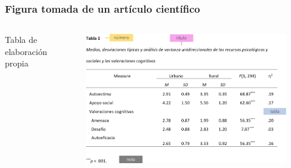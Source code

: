 \documentclass[
11pt, %
]{beamer}
\begin{document}
\begin{frame}
	\frametitle{Figura tomada de un artículo científico}

	\begin{columns}[c] %
		\begin{column}{0.5\textwidth} %
			Tabla de elaboración propia
		\end{column}
		\begin{column}{0.5\textwidth} %
			\begin{figure}
				\centering
				\includegraphics[width=1\linewidth]{images/screenshot022}
			\end{figure}

		\end{column}
	\end{columns}

\end{frame}
\end{document}
